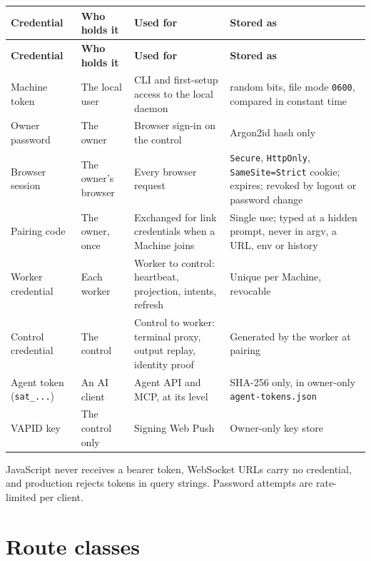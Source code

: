 \begin{small}
\begin{longtable}{>{\raggedright\arraybackslash}p{0.141\dimexpr \linewidth-8\tabcolsep\relax}>{\raggedright\arraybackslash}p{0.121\dimexpr \linewidth-8\tabcolsep\relax}>{\raggedright\arraybackslash}p{0.319\dimexpr \linewidth-8\tabcolsep\relax}>{\raggedright\arraybackslash}p{0.419\dimexpr \linewidth-8\tabcolsep\relax}}
\toprule
\textbf{Credential} & \textbf{Who holds it} & \textbf{Used for} & \textbf{Stored as} \\
\midrule
\endfirsthead
\toprule
\textbf{Credential} & \textbf{Who holds it} & \textbf{Used for} & \textbf{Stored as} \\
\midrule
\endhead
Machine token & The local user & CLI and first-setup access to the local daemon & 256 random bits, file mode \texttt{0600}, compared in constant time \\
Owner password & The owner & Browser sign-in on the control & Argon2id hash only \\
Browser session & The owner's browser & Every browser request & \texttt{Secure}, \texttt{HttpOnly}, \texttt{SameSite=\allowbreak{}Strict} cookie; expires; revoked by logout or password change \\
Pairing code & The owner, once & Exchanged for link credentials when a Machine joins & Single use; typed at a hidden prompt, never in argv, a URL, env or history \\
Worker credential & Each worker & Worker to control: heartbeat, projection, intents, refresh & Unique per Machine, revocable \\
Control credential & The control & Control to worker: terminal proxy, output replay, identity proof & Generated by the worker at pairing \\
Agent token (\texttt{sat\_\allowbreak{}.\allowbreak{}.\allowbreak{}.\allowbreak{}}) & An AI client & Agent API and MCP, at its level & SHA-256 only, in owner-only \texttt{agent-{}\allowbreak{}tokens.\allowbreak{}json} \\
VAPID key & The control only & Signing Web Push & Owner-only key store \\
\bottomrule
\end{longtable}
\end{small}

JavaScript never receives a bearer token, WebSocket URLs carry no credential, and production rejects tokens in query strings. Password attempts are rate-limited per client.

\section{\texorpdfstring{Route classes}{Route classes}}

